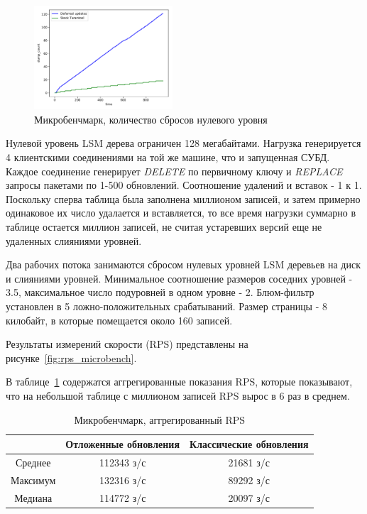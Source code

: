 \documentclass[a4paper,hidelinks,12pt]{article}
\begin{document}
\begin{figure}
\centering
\includegraphics[width=0.46\textwidth]{dump_count_microbench}
\caption{Микробенчмарк, количество сбросов нулевого уровня}
\label{fig:dump_count_microbench}
\end{figure}

Нулевой уровень LSM дерева ограничен 128 мегабайтами. Нагрузка генерируется 4
клиентскими соединениями на той же машине, что и запущенная СУБД. Каждое
соединение генерирует \textit{DELETE} по первичному ключу и \textit{REPLACE}
запросы пакетами по 1-500 обновлений. Соотношение удалений и вставок - 1 к 1.
Поскольку сперва таблица была заполнена миллионом записей, и затем примерно
одинаковое их число удалается и вставляется, то все время нагрузки суммарно в
таблице остается миллион записей, не считая устаревших версий еще не удаленных
слияниями уровней.

Два рабочих потока занимаются сбросом нулевых уровней LSM деревьев на диск и
слияниями уровней. Минимальное соотношение размеров соседних уровней - 3.5,
максимальное число подуровней в одном уровне - 2. Блюм-фильтр установлен в 5%
ложно-положительных срабатываний. Размер страницы - 8 килобайт, в которые
помещается около 160 записей.

Результаты измерений скорости (RPS) представлены на
рисунке~\ref{fig:rps_microbench}.

В таблице~\ref{table:rps_microbench} содержатся аггрегированные показания RPS,
которые показывают, что на небольшой таблице с миллионом записей RPS вырос в 6
раз в среднем.

\begin{table}
\centering
\caption{Микробенчмарк, аггрегированный RPS}
\label{table:rps_microbench}
\begin{tabular}{|c|c|c|} \hline
\cellcolor{table_header}&
\cellcolor{table_header}Отложенные обновления &
\cellcolor{table_header}Классические обновления\\ \hline

\cellcolor{table_header}Среднее &112343 з/с &21681 з/с\\ \hline
\cellcolor{table_header}Максимум &132316 з/с &89292 з/с\\ \hline
\cellcolor{table_header}Медиана &114772 з/с &20097 з/с\\
\hline\end{tabular}
\end{table}
\end{document}
